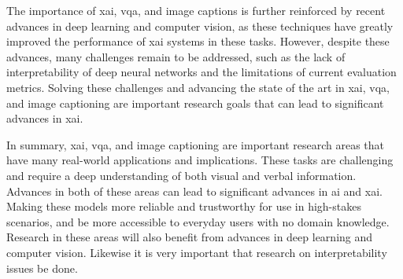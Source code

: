 The importance of \gls{xai}, \gls{vqa}, and image captions is further reinforced by recent advances in deep learning and computer vision, as these techniques have greatly improved the performance of \gls{xai} systems in these tasks. 
However, despite these advances, many challenges remain to be addressed, such as the lack of interpretability of deep neural networks and the limitations of current evaluation metrics. Solving these challenges and advancing the state of the art in \gls{xai}, \gls{vqa}, and image captioning are important research goals that can lead to significant advances in \gls{xai}.

In summary, \gls{xai}, \gls{vqa}, and image captioning are important research areas that have many real-world applications and implications. 
These tasks are challenging and require a deep understanding of both visual and verbal information. Advances in both of these areas can lead to significant advances in \gls{ai} and \gls{xai}. Making these models more reliable and trustworthy for use in high-stakes scenarios, and be more accessible to everyday users with no domain knowledge. 
Research in these areas will also benefit from advances in deep learning and computer vision. Likewise it is very important that research on interpretability issues be done.
